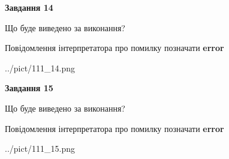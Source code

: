 \documentclass[11pt, ukrainian]{article}
\begin{document}
{\begin {large}
{\begin {center}\textbf{Завдання 14}\end {center}}\par
Що буде виведено за виконання? \par
Повідомлення інтерпретатора про помилку позначати \textbf{error}

\begin{center}
	{../pict/111_14.png}
\end{center}
\newpage

{\begin {center}\textbf{Завдання 15}\end {center}}\par
Що буде виведено за виконання? \par
Повідомлення інтерпретатора про помилку позначати \textbf{error}

\begin{center}
	{../pict/111_15.png}
\end{center}
\newpage

\end {large}}
\end{document}
